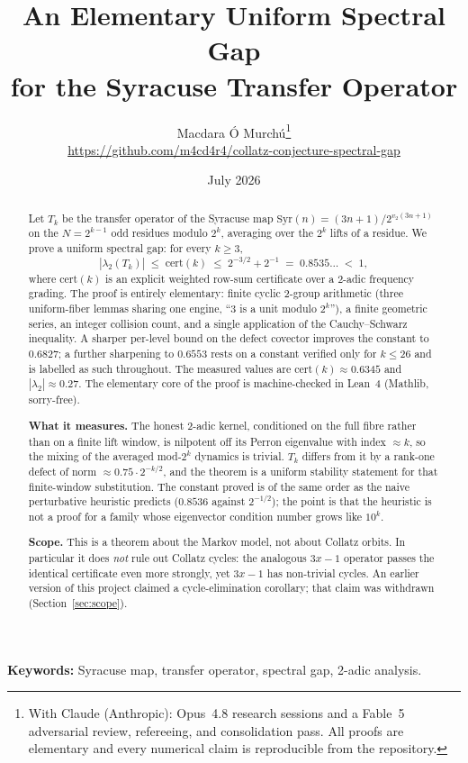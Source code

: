 \documentclass[12pt,a4paper]{article}
\title{An Elementary Uniform Spectral Gap\\for the Syracuse Transfer Operator}
\author{Macdara Ó Murchú\thanks{With Claude (Anthropic): Opus~4.8 research sessions and a
Fable~5 adversarial review, refereeing, and consolidation pass. All proofs are elementary and
every numerical claim is reproducible from the repository.}\\
\small \url{https://github.com/m4cd4r4/collatz-conjecture-spectral-gap}}
\date{July 2026}
\newcommand{\Syr}{\mathrm{Syr}}
\newcommand{\vtwo}{v_2}
\newcommand{\cert}{\mathrm{cert}}
\begin{document}
\maketitle

\begin{abstract}
Let $T_k$ be the transfer operator of the Syracuse map $\Syr(n) = (3n+1)/2^{\vtwo(3n+1)}$ on the
$N = 2^{k-1}$ odd residues modulo $2^k$, averaging over the $2^k$ lifts of a residue. We prove a
uniform spectral gap: for every $k \geq 3$,
\[
  |\lambda_2(T_k)| \;\leq\; \cert(k) \;\leq\; 2^{-3/2} + 2^{-1} \;=\; 0.8535\ldots \;<\; 1,
\]
where $\cert(k)$ is an explicit weighted row-sum certificate over a 2-adic frequency grading.
The proof is entirely elementary: finite cyclic 2-group arithmetic (three uniform-fiber lemmas
sharing one engine, ``3 is a unit modulo $2^k$''), a finite geometric series, an integer collision
count, and a single application of the Cauchy--Schwarz inequality. A sharper per-level bound on
the defect covector improves the constant to $0.6827$; a further sharpening to $0.6553$ rests on
a constant verified only for $k \leq 26$ and is labelled as such throughout. The measured values
are $\cert(k) \approx 0.6345$ and $|\lambda_2| \approx 0.27$. The elementary core of the proof is
machine-checked in Lean~4 (Mathlib, sorry-free).

\textbf{What it measures.} The honest 2-adic kernel, conditioned on the full fibre rather than
on a finite lift window, is nilpotent off its Perron eigenvalue with index $\approx k$, so the
mixing of the averaged mod-$2^k$ dynamics is trivial. $T_k$ differs from it by a rank-one defect
of norm $\approx 0.75 \cdot 2^{-k/2}$, and the theorem is a uniform stability statement for that
finite-window substitution. The constant proved is of the same order as the naive perturbative
heuristic predicts ($0.8536$ against $2^{-1/2}$); the point is that the heuristic is not a proof
for a family whose eigenvector condition number grows like $10^k$.

\textbf{Scope.} This is a theorem about the Markov model, not about Collatz orbits. In
particular it does \emph{not} rule out Collatz cycles: the analogous $3x{-}1$ operator passes the
identical certificate even more strongly, yet $3x-1$ has non-trivial cycles. An earlier version
of this project claimed a cycle-elimination corollary; that claim was withdrawn (Section~\ref{sec:scope}).
\end{abstract}

\noindent\textbf{Keywords:} Syracuse map, transfer operator, spectral gap, 2-adic analysis.
\end{document}
